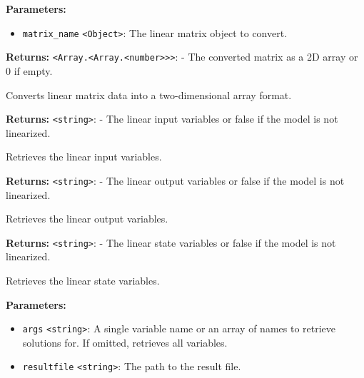 \documentclass[12pt,a4paper]{article}
\begin{document}
\noindent \textbf{Parameters:}
\begin{itemize}
  \item \texttt{matrix\_name} \texttt{<Object>}: The linear matrix object to convert.
\end{itemize}

\noindent \textbf{Returns:} \texttt{<Array.<Array.<number>>>}: - The converted matrix as a 2D array or 0 if empty.

\noindent Converts linear matrix data into a two-dimensional array format.

\vspace{5mm}
\noindent {}


\noindent \textbf{Returns:} \texttt{<string>}: - The linear input variables or false if the model is not linearized.

\noindent Retrieves the linear input variables.

\vspace{5mm}
\noindent {}


\noindent \textbf{Returns:} \texttt{<string>}: - The linear output variables or false if the model is not linearized.

\noindent Retrieves the linear output variables.

\vspace{5mm}
\noindent {}


\noindent \textbf{Returns:} \texttt{<string>}: - The linear state variables or false if the model is not linearized.

\noindent Retrieves the linear state variables.

\vspace{5mm}
\noindent {}


\noindent \textbf{Parameters:}
\begin{itemize}
  \item \texttt{args} \texttt{<string>}: A single variable name or an array of names to retrieve solutions for. If omitted, retrieves all variables.
  \item \texttt{resultfile} \texttt{<string>}: The path to the result file.
\end{itemize}
\end{document}
